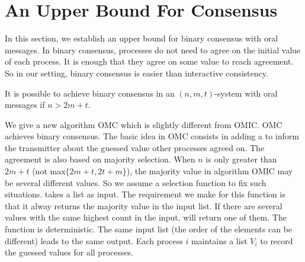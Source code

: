 \section{An Upper Bound For Consensus}\label{sec:consensus}

In this section, we establish an upper bound for binary consensus with oral messages. 
In binary consensus, processes do not need to agree on the initial value of each process. It is enough that they agree on some value to reach agreement.
So in our setting, binary consensus is easier than interactive consistency.

\begin{theorem} \label{thmConsensus}
It is possible to achieve binary consensus in an  $(n,m,t)$-system with oral messages if  $n>2m+t$.
\end{theorem}

We give a new algorithm OMC which is slightly different from OMIC. OMC achieves binary consensus.
The basic idea in OMC consists in adding a  to inform the transmitter about the guessed value other processes agreed on. The agreement is also based on majority selection. When $n$ is only greater than $2m+t$ (not max$\{2m+t,2t+m\}$), the majority value in algorithm OMIC may be several different values.
So we assume a selection function  to fix such situations. 
 takes a list as input. 
The requirement we make for this function is that it alway returns the majority value in the input list. 
If there are several values with the same highest count in the input,  will return one of them. 
The function is deterministic. The same input list (the order of the elements can be different) leads to the same output. 
Each process $i$ maintains a list $V_i$ to record the
guessed values for all processes.

